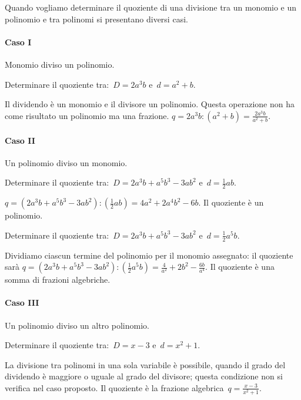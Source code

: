 Quando vogliamo determinare il quoziente di una divisione tra un monomio e un 
polinomio e tra polinomi si presentano diversi casi.

\paragraph{Caso I}Monomio diviso un polinomio.
\begin{itemize*}
 \item Determinare il quoziente tra:~$D=2a^{3}b$ e~$d=a^{2}+b$.
\end{itemize*}
Il dividendo è un monomio e il divisore un polinomio.
Questa operazione non ha come risultato un polinomio ma una
frazione. $q=2a^{3}b:\left(a^{2}+b\right)=\frac{2a^{3}b}{a^{2}+b}$.

\paragraph{Caso II}Un polinomio diviso un monomio.
\begin{itemize*}
 \item Determinare il quoziente tra:~$D=2a^{3}b+a^{5}b^{3}-3ab^{2}$ 
  e~$d=\frac{1}{2}ab$.
\end{itemize*}
$q=\left(2a^{3}b+a^{5}b^{3}-3ab^{2}\right):\left(\frac{1}{2}ab\right)=
   4a^{2}+2a^{4}b^{2}-6b$.
Il quoziente è un polinomio.
\begin{itemize*}
 \item Determinare il quoziente tra:~$D=2a^{3}b+a^{5}b^{3}-3ab^{2}$ 
  e~$d=\frac{1}{2}a^{5}b$.
\end{itemize*}
Dividiamo ciascun termine del polinomio per il monomio assegnato: il quoziente 
sarà
$q=\left(2a^{3}b+a^{5}b^{3}-3ab^{2}\right):\left(\frac{1}{2}a^{5}b\right)=
   \frac{4}{a^{2}}+2b^{2}-\frac{6b}{a^{4}}$.
Il quoziente è una somma di frazioni algebriche.

\paragraph{Caso III}Un polinomio diviso un altro polinomio.
\begin{itemize*}
 \item Determinare il quoziente tra:~$D=x-3$ e~$d=x^{2}+1$.
\end{itemize*}
La divisione tra polinomi in una sola variabile è possibile, quando il grado 
del dividendo è maggiore o uguale al grado del divisore;
questa condizione non si verifica nel caso proposto.
Il quoziente è la frazione algebrica~$q=\frac{x-3}{x^{2}+1}$.

